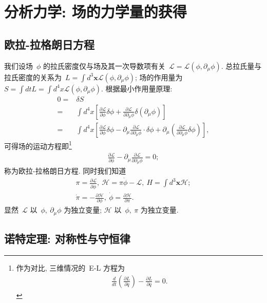 
\section{分析力学: 场的力学量的获得}
\subsection{欧拉-拉格朗日方程}
我们设场~$\phi$ 的拉氏密度仅与场及其一次导数项有关~$\mathcal{L}=\mathcal{L}(\phi,\partial_\mu\phi)$. 总拉氏量与拉氏密度的关系为~$L=\int d^3\bm{x}\mathcal{L}(\phi,\partial_\mu\phi)$; 场的作用量为~$S=\int dtL=\int d^4x\mathcal{L}(\phi,\partial_\mu\phi)$. 根据最小作用量原理:
\begin{align}
0=&\delta S\nonumber\\
=&\int d^4x\left[\frac{\partial\mathcal{L}}{\partial\phi}\delta\phi+\frac{\partial\mathcal{L}}{\partial\partial_\mu\phi}\delta(\partial_\mu\phi)\right]\nonumber\\
=&\int d^4x\left[\frac{\partial\mathcal{L}}{\partial\phi}\delta\phi-\partial_\mu\frac{\partial\mathcal{L}}{\partial\partial_\mu\phi}\cdot\delta\phi+
\partial_\mu\left(\frac{\partial\mathcal{L}}{\partial\partial_\mu\phi}\delta\phi\right)\right],
\end{align}
可得场的运动方程即\footnote{作为对比, 三维情况的~E-L 方程为
\begin{align}
\frac{d}{dt}\left(\frac{\partial L}{\partial\dot{q}}\right)-\frac{\partial L}{\partial q}=0.
\end{align}}
\begin{align}
\frac{\partial\mathcal{L}}{\partial\phi}-\partial_\mu\frac{\partial\mathcal{L}}{\partial\partial_\mu\phi}=0;
\end{align}
称为欧拉-拉格朗日方程. 同时我们知道
\begin{gather}
\pi=\frac{\partial\mathcal{L}}{\partial\dot{\phi}},~\mathcal{H}=\pi\dot{\phi}-\mathcal{L},~H=\int d^3\bm{x}\mathcal{H};\\
\dot{\pi}=-\frac{\partial\mathcal{H}}{\partial\phi},~\dot{\phi}=\frac{\partial\mathcal{H}}{\partial\pi}.
\end{gather}
显然~$\mathcal{L}$ 以~$\phi,~\partial_\mu\phi$ 为独立变量; $\mathcal{H}$ 以~$\phi,~\pi$ 为独立变量.


\subsection{诺特定理: 对称性与守恒律}


